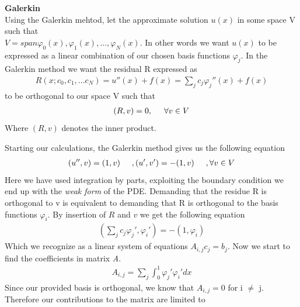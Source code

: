 \documentclass[a4paper,norsk]{article}
\begin{document}
\textbf{Galerkin}\\
Using the Galerkin mehtod, let the approximate solution $u(x)$ in some space V such that \\
$V = span {\varphi_0(x), \varphi_1(x),...,\varphi_N(x)}$. In other words we want $u(x)$ to be expressed as a linear combination of our chosen basis functions $\varphi_j$. In the Galerkin method we want the residual R expressed as 
\begin{align*}
R(x;c_0,c_1,...c_N) = u''(x) + f(x) =  \sum\limits_{j} c_j \varphi_j''(x) + f(x)
\end{align*}
to be orthogonal to our space V such that 
\begin{align*}
(R,v) = 0, \hspace{5mm} \forall v \in V
\end{align*}
Where $(R,v)$ denotes the inner product. \newpage

Starting our calculations, the Galerkin method gives us the following equation
\begin{align*}
(u'',v) = (1,v) \hspace{5mm}, (u',v') = -(1,v) \hspace{5mm} ,\forall v \in V
\end{align*}
Here we have used integration by parts, exploiting the boundary condition we end up with the \textit{weak form} of the PDE. Demanding that the residue R is orthogonal to v is equivalent to demanding that R is orthogonal to the basis functions 
$\varphi_i$. By insertion of $R$ and $v$ we get the following equation
\begin{align*}
(\sum\limits_{j}c_j\varphi_j', \varphi_i') = -(1,\varphi_i)
\end{align*}
Which we recognize as a linear system of equations $A_{i,j} c_j = b_j$. Now we start to find the coefficients in matrix 
\textit{A}. 
\begin{align*}
A_{i,j} = \sum\limits_{j} \int_0^1 \varphi_j' \varphi_i' dx
\end{align*}
Since our provided basis is orthogonal, we know that $A_{i,j} = 0$ for i $\neq$ j. Therefore our contributions to the matrix are limited to 
\end{document}
